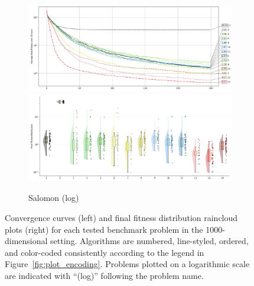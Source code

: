 \begin{figure}[p]
\begin{subfigure}{1\textwidth}
    \centering
    \includegraphics[width=.49\textwidth]{Figures/results/1000/Salomon_All_selected_algorithms_dim1000_annot_legend.png}
    \includegraphics[width=.49\textwidth]{Figures/results/1000/Salomon_all_dim1000_raincloud_vertical.png}
    \caption{Salomon (log)}
\end{subfigure}

\captionsetup{list=no}
\caption[Convergence curves and final fitness distribution raincloud plots for 1000-dimensional problems]{Convergence curves (left) and final fitness distribution raincloud plots (right) for each tested benchmark problem in the 1000-dimensional setting. Algorithms are numbered, line-styled, ordered, and color-coded consistently according to the legend in Figure~\ref{fig:plot_encoding}. Problems plotted on a logarithmic scale are indicated with ``(log)'' following the problem name.}
\end{figure}





